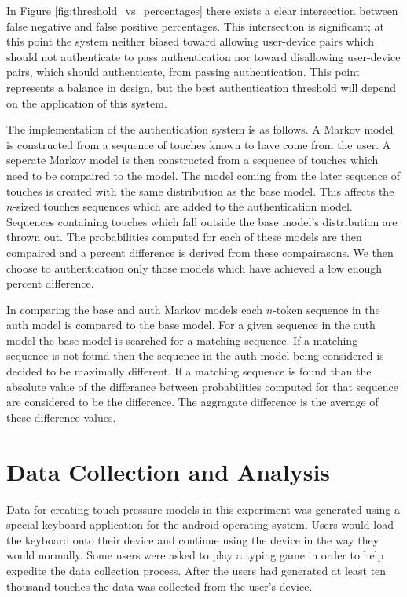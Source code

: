 \documentclass{acm_proc_article-sp}
\begin{document}
In Figure \ref{fig:threshold_vs_percentages} there exists a clear intersection between false negative and false positive percentages. This intersection is significant; at this point the system neither biased toward allowing user-device pairs which should not authenticate to pass authentication nor toward disallowing user-device pairs, which should authenticate, from passing authentication. This point represents a balance in design, but the best authentication threshold will depend on the application of this system.

The implementation of the authentication system is as follows. A Markov model is constructed from a sequence of touches known to have come from the user. A seperate Markov model is then constructed from a sequence of touches which need to be compaired to the model.
The model coming from the later sequence of touches is created with the same distribution as the base model. This affects the $n$-sized touches sequences which are added to the authentication model.
Sequences containing touches which fall outside the base model's distribution are thrown out.
The probabilities computed for each of these models are then compaired and a percent difference is derived from these compairasons. We then choose to authentication only those models which have achieved a low enough percent difference.

In comparing the base and auth Markov models each $n$-token sequence in the auth model is compared to the base model.
For a given sequence in the auth model the base model is searched for a matching sequence.
If a matching sequence is not found then the sequence in the auth model being considered is decided to be maximally different.
If a matching sequence is found than the absolute value of the differance between probabilities computed for that sequence are considered to be the difference.
The aggragate difference is the average of these difference values.  

\section{Data Collection and Analysis}
\label{sec:data_collection}
Data for creating touch pressure models in this experiment was generated using a special keyboard application for the android operating system. Users would load the keyboard onto their device and continue using the device in the way they would normally. Some users were asked to play a typing game in order to help expedite the data collection process. After the users had generated at least ten thousand touches the data was collected from the user's device.
\end{document}
